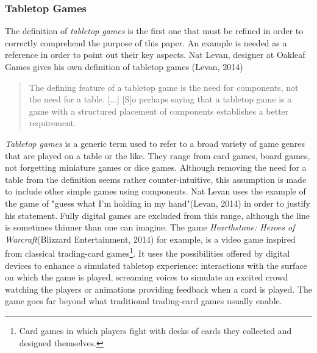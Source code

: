 \subsubsection{Tabletop Games}
The definition of \textit{tabletop games} is the first one that must be refined in order to correctly comprehend the purpose of this paper. An example is needed as a reference in order to point out their key aspects. Nat Levan, designer at Oakleaf Games gives his own definition of tabletop games (Levan, 2014)\cite{web:oak}
\begin{quotation}
The defining feature of a tabletop game is the need for components, not the need for a table. [...] [S]o perhaps saying that a tabletop game is a game with a structured placement of components establishes a better requirement.
\end{quotation}
\textit{Tabletop games} is a generic term used to refer to a broad variety of game genres that are played on a table or the like. They range from card games, board games, not forgetting miniature games or dice games. Although removing the need for a table from the definition seems rather counter-intuitive, this assumption is made to include other simple games using components. Nat Levan uses the example of the game of "guess what I'm holding in my hand"(Levan, 2014)\cite{web:oak} in order to justify his statement. Fully digital games are excluded from this range, although the line is sometimes thinner than one can imagine. The game \textit{Hearthstone: Heroes of Warcraft}(Blizzard Entertainment, 2014) for example, is a video game inspired from classical trading-card games\footnote{Card games in which players fight with decks of cards they collected and designed themselves.}. It uses the possibilities offered by digital devices to enhance a simulated tabletop experience: interactions with the surface on which the game is played, screaming voices to simulate an excited crowd watching the players or animations providing feedback when a card is played. The game goes far beyond what traditional trading-card games usually enable.

